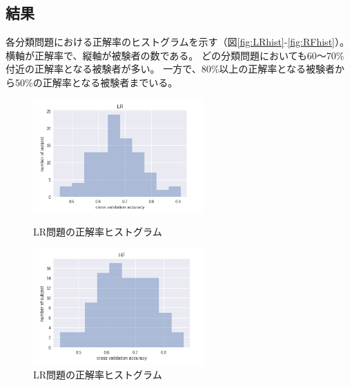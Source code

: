 \subsection{\mc 結果}
各分類問題における正解率のヒストグラムを示す（図\ref{fig:LRhist}-\ref{fig:RFhist}）。
横軸が正解率で、縦軸が被験者の数である。
どの分類問題においても60〜70\%付近の正解率となる被験者が多い。
一方で、80\%以上の正解率となる被験者から50\%の正解率となる被験者までいる。

\begin{figure}[t]
    \begin{minipage}{0.5\hsize}
     \begin{center}
      \includegraphics[width=65mm]{images/LR.png}
     \end{center}
     \caption{LR問題の正解率ヒストグラム}
     \label{fig:LRhist}
    \end{minipage}
    \begin{minipage}{0.5\hsize}
     \begin{center}
      \includegraphics[width=65mm]{images/HF.png}
     \end{center}
     \caption{LR問題の正解率ヒストグラム}
     \label{fig:HFhist}
    \end{minipage}
\end{figure}
